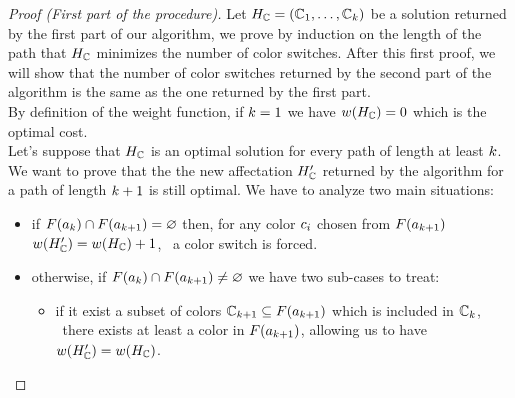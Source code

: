 \begin{proof}[Proof (First part of the procedure)]
  Let $H_{\mathbb{C}} = (\mathbb{C}_1,\ldots,\mathbb{C}_{k})$ be a solution returned by the first part of our algorithm, we prove by induction on the length of the path that $H_{\mathbb{C}}$ minimizes the number of color switches. After this first proof, we will show that the number of color switches returned by the second part of the algorithm is the same as the one returned by the first part. \\
  By definition of the weight function, if $k = 1$ we have $w(H_{\mathbb{C}}) = 0$ which is the optimal cost.\\
  Let's suppose that $H_{\mathbb{C}}$ is an optimal solution for every path of length at least $k$. We want to prove that the the new affectation $H_{\mathbb{C}}'$ returned by the algorithm for a path of length $k+1$ is still optimal. We have to analyze two main situations:

  \begin{itemize}
    \item if $F(a_k) \cap F(a_{k+1}) = \varnothing$ then, for any color $c_i$ chosen from $F(a_{k+1})$ $w(H_{\mathbb{C}}') = w(H_{\mathbb{C}}) + 1$, \ie\ a color switch is forced.
    \item otherwise, if $F(a_k) \cap F(a_{k+1}) \neq \varnothing$ we have two sub-cases to treat:
          \begin{itemize}

            \item if it exist a subset of colors $\mathbb{C}_{k+1} \subseteq F(a_{k+1})$ which is included in $\mathbb{C}_k$, \ie\ there exists at least a color in $F(a_{k+1})$, allowing us to have $w(H_{\mathbb{C}}') = w(H_{\mathbb{C}})$.


\end{itemize}
\end{itemize}
\end{proof}
